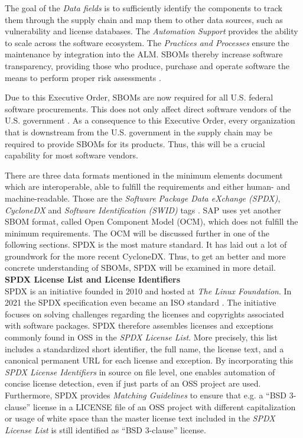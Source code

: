 The goal of the \textit{Data fields} is to sufficiently identify the components to track them through the supply chain and map them to other data sources, such as vulnerability and license databases. The \textit{Automation Support} provides the ability to scale across the software ecosystem. The \textit{Practices and Processes} ensure the maintenance by integration into the ALM. SBOMs thereby increase software transparency, providing those who produce, purchase and operate software the means to perform proper risk assessments \cite{NTIASBOM}.\par
Due to this Executive Order, SBOMs are now required for all U.S. federal software procurements. This does not only affect direct software vendors of the U.S. government \cite{ExecutiveOrderSBOM}. As a consequence to this Executive Order, every organization that is downstream from the U.S. government in the supply chain may be required to provide SBOMs for its products. Thus, this will be a crucial capability for most software vendors.\par
There are three data formats mentioned in the minimum elements document which are interoperable, able to fulfill the requirements and either human- and machine-readable. Those are the \textit{Software Package Data eXchange (SPDX)}, \textit{CycloneDX} and \textit{Software Identification (SWID)} tags \cite{NTIASBOM}. SAP uses yet another SBOM format, called Open Component Model (OCM), which does not fulfill the minimum requirements. The OCM will be discussed further in one of the following sections. SPDX is the most mature standard. It has laid out a lot of groundwork for the more recent CycloneDX. Thus, to get an better and more concrete understanding of SBOMs, SPDX will be examined in more detail.\\

\noindent   
\textbf{SPDX License List and License Identifiers}\\
SPDX is an initiative founded in 2010 and hosted at \textit{The Linux Foundation}. In 2021 the SPDX specification even became an ISO standard \cite{SPDXISO}. The initiative focuses on solving challenges regarding the licenses and copyrights associated with software packages. SPDX therefore assembles licenses and exceptions commonly found in OSS in the \textit{SPDX License List}. More precisely, this list includes a standardized short identifier, the full name, the license text, and a canonical permanent URL for each license and exception. By incorporating this \textit{SPDX License Identifiers} in source on file level, one enables automation of concise license detection, even if just parts of an OSS project are used. Furthermore, SPDX provides \textit{Matching Guidelines} to ensure that e.g. a \enquote{BSD 3-clause} license in a LICENSE file of an OSS project with different capitalization or usage of white space than the master license text included in the \textit{SPDX License List} is still identified as \enquote{BSD 3-clause} license.\\

